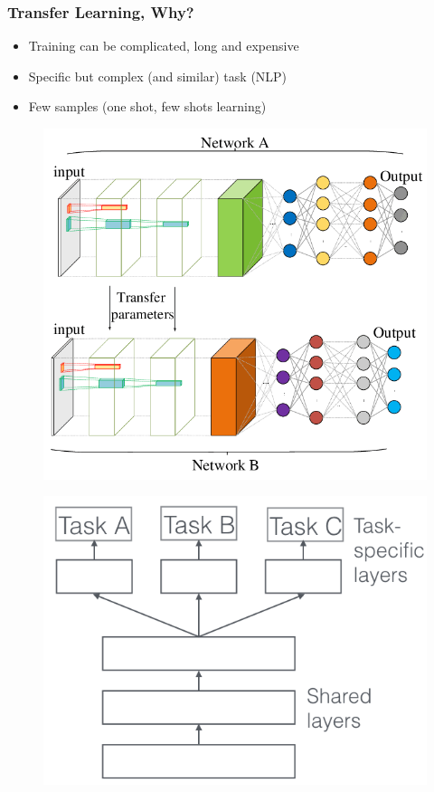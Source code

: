 \begin{frame}\frametitle{Transfer Learning, Why?}
   \begin{itemize}
      \item Training can be complicated, long and expensive
      \item Specific but complex (and similar) task (NLP)
      \item Few samples (one shot, few shots learning)
   \end{itemize}
   
   \vspace{.3cm}
   \begin{minipage}{0.48\linewidth}
      \begin{figure}[H]
         \includegraphics[scale=.2]{../images/illustrations/model_transfer_learning.png}
      \end{figure}
   \end{minipage}
   \begin{minipage}{0.48\linewidth}
      \begin{figure}[H]
         \includegraphics[scale=.2]{../images/illustrations/model_multitask_learning.png}

\end{figure}
\end{minipage}
\end{frame}
